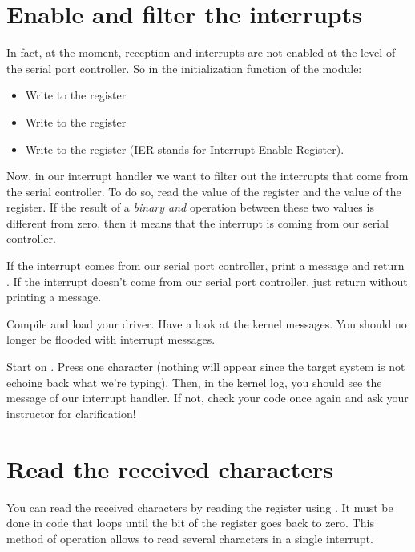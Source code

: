 \section{Enable and filter the interrupts}

In fact, at the moment, reception and interrupts are not enabled at
the level of the serial port controller. So in the initialization
function of the module:
\begin{itemize}
\item Write  to the
   register
\item Write  to the
   register
\item Write  to the 
  register (IER stands for Interrupt Enable Register).
\end{itemize}

Now, in our interrupt handler we want to filter out the interrupts
that come from the serial controller. To do so, read the value of the
 register and the value of the
 register. If the result of a {\em binary and}
operation between these two values is different from zero, then it
means that the interrupt is coming from our serial controller.

If the interrupt comes from our serial port controller, print a
message and return . If the interrupt doesn't come from
our serial port controller, just return  without printing a
message.

Compile and load your driver. Have a look at the kernel messages. You
should no longer be flooded with interrupt messages.

Start  on . Press one character (nothing will
appear since the target system is not echoing back what we're
typing). Then, in the kernel log, you should see the message of our
interrupt handler. If not, check your code once again and ask your
instructor for clarification!

\section{Read the received characters}

You can read the received characters by reading the 
register using . It must be done in code that loops until the
 bit of the  register goes back to
zero. This method of operation allows to read several characters in a
single interrupt.

